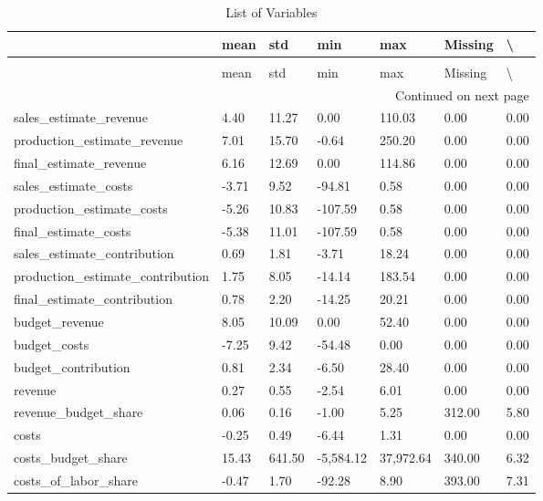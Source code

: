 \begin{landscape}\begin{longtable}{lllllll}
\caption{List of Variables} \label{eda_1} \\
\toprule
 & mean & std & min & max & Missing & \textbackslash \\%
\midrule
\endfirsthead
\caption[]{List of Variables} \\
\toprule
 & mean & std & min & max & Missing & \textbackslash \\%
\midrule
\endhead
\midrule
\multicolumn{7}{r}{Continued on next page} \\
\midrule
\endfoot
\bottomrule
\endlastfoot
sales\_estimate\_revenue & 4.40 & 11.27 & 0.00 & 110.03 & 0.00 & 0.00 \\
production\_estimate\_revenue & 7.01 & 15.70 & -0.64 & 250.20 & 0.00 & 0.00 \\
final\_estimate\_revenue & 6.16 & 12.69 & 0.00 & 114.86 & 0.00 & 0.00 \\
sales\_estimate\_costs & -3.71 & 9.52 & -94.81 & 0.58 & 0.00 & 0.00 \\
production\_estimate\_costs & -5.26 & 10.83 & -107.59 & 0.58 & 0.00 & 0.00 \\
final\_estimate\_costs & -5.38 & 11.01 & -107.59 & 0.58 & 0.00 & 0.00 \\
sales\_estimate\_contribution & 0.69 & 1.81 & -3.71 & 18.24 & 0.00 & 0.00 \\
production\_estimate\_contribution & 1.75 & 8.05 & -14.14 & 183.54 & 0.00 & 0.00 \\
final\_estimate\_contribution & 0.78 & 2.20 & -14.25 & 20.21 & 0.00 & 0.00 \\
budget\_revenue & 8.05 & 10.09 & 0.00 & 52.40 & 0.00 & 0.00 \\
budget\_costs & -7.25 & 9.42 & -54.48 & 0.00 & 0.00 & 0.00 \\
budget\_contribution & 0.81 & 2.34 & -6.50 & 28.40 & 0.00 & 0.00 \\
revenue & 0.27 & 0.55 & -2.54 & 6.01 & 0.00 & 0.00 \\
revenue\_budget\_share & 0.06 & 0.16 & -1.00 & 5.25 & 312.00 & 5.80 \\
costs & -0.25 & 0.49 & -6.44 & 1.31 & 0.00 & 0.00 \\
costs\_budget\_share & 15.43 & 641.50 & -5,584.12 & 37,972.64 & 340.00 & 6.32 \\
costs\_of\_labor\_share & -0.47 & 1.70 & -92.28 & 8.90 & 393.00 & 7.31 \\

\end{longtable}
\end{landscape}
